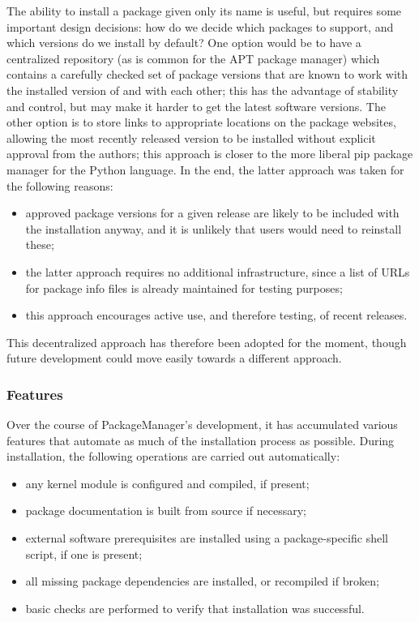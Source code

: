 The ability to install a package given only its name is useful, but requires
some important design decisions: how do we decide which packages to support, and
which versions do we install by default?  One option would be to have a
centralized repository (as is common for the {\sf APT} package manager) which
contains a carefully checked set of package versions that are known to work with
the installed version of \GAP and with each other; this has the advantage of
stability and control, but may make it harder to get the latest software
versions.  The other option is to store links to appropriate locations on the
package websites, allowing the most recently released version to be installed
without explicit approval from the \GAP authors; this approach is closer to the
more liberal {\sf pip} package manager for the Python language.
In the end, the latter approach was taken for the following reasons:
\begin{itemize}
\item approved package versions for a given release are likely to be included
  with the \GAP installation anyway, and it is unlikely that users would need
  to reinstall these;
\item the latter approach requires no additional infrastructure, since a
  list of URLs for package info files is already maintained for testing purposes;
\item this approach encourages active use, and therefore testing, of recent releases.
\end{itemize}
This decentralized approach has therefore been adopted for the moment, though
future development could move easily towards a different approach.

\subsubsection{Features}

Over the course of {\sf PackageManager}'s development, it has accumulated
various features that automate as much of the installation process as possible.
During installation, the following operations are carried out automatically:
\begin{itemize}
\item any kernel module is configured and compiled, if present;
\item package documentation is built from source if necessary;
\item external software prerequisites are installed using a package-specific
  shell script, if one is present;
\item all missing package dependencies are installed, or recompiled if broken;
\item basic checks are performed to verify that installation was successful.
\end{itemize}

